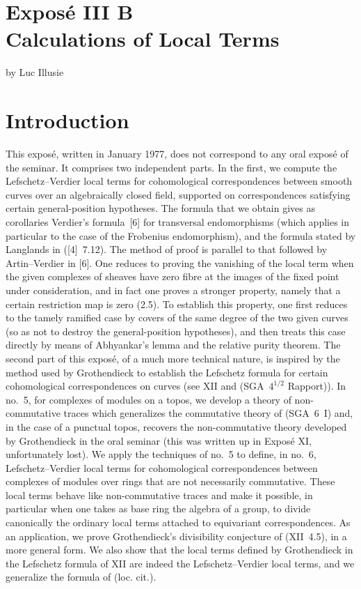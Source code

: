 \documentclass[11pt]{article}
\begin{document}
\clearpage
\section*{Exposé III B\\Calculations of Local Terms}
\begin{center}
by Luc Illusie
\end{center}

\section*{Introduction}

This exposé, written in January 1977, does not correspond to any oral exposé of the seminar. It comprises two independent parts. In the first, we compute the Lefschetz--Verdier local terms for cohomological correspondences between smooth curves over an algebraically closed field, supported on correspondences satisfying certain general-position hypotheses. The formula that we obtain gives as corollaries Verdier's formula~[6] for transversal endomorphisms (which applies in particular to the case of the Frobenius endomorphism), and the formula stated by Langlands in ([4]~7.12). The method of proof is parallel to that followed by Artin--Verdier in [6]. One reduces to proving the vanishing of the local term when the given complexes of sheaves have zero fibre at the images of the fixed point under consideration, and in fact one proves a stronger property, namely that a certain restriction map is zero (2.5). To establish this property, one first reduces to the tamely ramified case by covers of the same degree of the two given curves (so as not to destroy the general-position hypotheses), and then treats this case directly by means of Abhyankar's lemma and the relative purity theorem. The second part of this exposé, of a much more technical nature, is inspired by the method used by Grothendieck to establish the Lefschetz formula for certain cohomological correspondences on curves (see XII and (SGA~$4^{1/2}$ Rapport)). In no.~5, for complexes of modules on a topos, we develop a theory of non-commutative traces which generalizes the commutative theory of (SGA~6~I) and, in the case of a punctual topos, recovers the non-commutative theory developed by Grothendieck in the oral seminar (this was written up in Exposé XI, unfortunately lost). We apply the techniques of no.~5 to define, in no.~6, Lefschetz--Verdier local terms for cohomological correspondences between complexes of modules over rings that are not necessarily commutative. These local terms behave like non-commutative traces and make it possible, in particular when one takes as base ring the algebra of a group, to divide canonically the ordinary local terms attached to equivariant correspondences. As an application, we prove Grothendieck's divisibility conjecture of (XII~4.5), in a more general form. We also show that the local terms defined by Grothendieck in the Lefschetz formula of XII are indeed the Lefschetz--Verdier local terms, and we generalize the formula of (loc. cit.).
\end{document}
